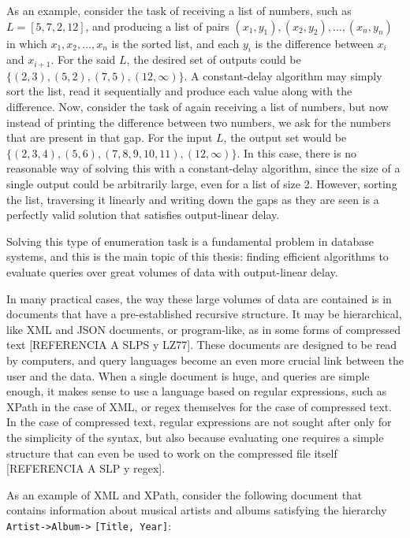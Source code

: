 As an example, consider the task of receiving a list of numbers, such as $L = [5, 7, 2, 12]$, and producing a list of pairs $(x_1,y_1),(x_2,y_2),\ldots,(x_n,y_n)$ in which $x_1,x_2,\ldots,x_n$ is the sorted list, and each $y_i$ is the difference between $x_i$ and $x_{i+1}$. For the said $L$, the desired set of outputs could be $\{(2,3), (5,2), (7,5),(12,\infty)\}$. A constant-delay algorithm may simply sort the list, read it sequentially and produce each value along with the difference. Now, consider the task of again receiving a list of numbers, but now instead of printing the difference between two numbers, we ask for the numbers that are present in that gap. For the input $L$, the output set would be $\{(2,3,4),(5,6),(7,8,9,10,11),(12,\infty)\}$. In this case, there is no reasonable way of solving this with a constant-delay algorithm, since the size of a single output could be arbitrarily large, even for a list of size 2. However, sorting the list, traversing it linearly and writing down the gaps as they are seen is a perfectly valid solution that satisfies output-linear delay.

Solving this type of enumeration task is a fundamental problem in database systems, and this is the main topic of this thesis: finding efficient algorithms to evaluate queries over great volumes of data with output-linear delay.

In many practical cases, the way these large volumes of data are contained is in documents that have a pre-established recursive structure. It may be hierarchical, like XML and JSON documents, or program-like, as in some forms of compressed text [REFERENCIA A SLPS y LZ77]. These documents are designed to be read by computers, and query languages become an even more crucial link between the user and the data. When a single document is huge, and queries are simple enough, it makes sense to use a language based on regular expressions, such as XPath in the case of XML, or regex themselves for the case of compressed text. In the case of compressed text, regular expressions are not sought after only for the simplicity of the syntax, but also because evaluating one requires a simple structure that can even be used to work on the compressed file itself [REFERENCIA A SLP y regex].

As an example of XML and XPath, consider the following document that contains information about musical artists and albums satisfying the hierarchy {\tt Artist->Album->} {\tt [Title, Year]}:

